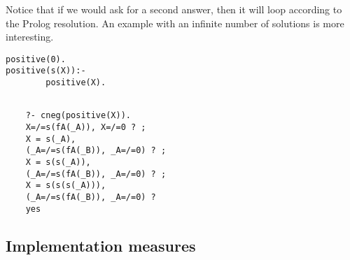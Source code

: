 \documentclass{llncs}
\begin{document}
Notice that if we would ask for a second answer, then it will loop
according to the Prolog resolution. An example with an infinite number
of solutions is more interesting.

{\small
\begin{minipage}{1.5in}
\begin{verbatim}
positive(0). 
positive(s(X)):-
        positive(X).  
\end{verbatim}
\end{minipage} 
\begin{minipage}{2.5in}
\begin{verbatim} 

    ?- cneg(positive(X)).
    X=/=s(fA(_A)), X=/=0 ? ;
    X = s(_A), 
    (_A=/=s(fA(_B)), _A=/=0) ? ;
    X = s(s(_A)), 
    (_A=/=s(fA(_B)), _A=/=0) ? ;
    X = s(s(s(_A))),
    (_A=/=s(fA(_B)), _A=/=0) ? 
    yes
\end{verbatim} 
\end{minipage}
}









\subsection{Implementation measures}
\end{document}

